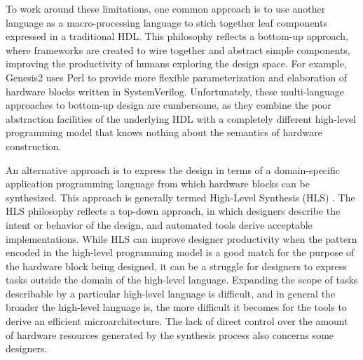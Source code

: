 To work around these limitations, one common approach is to use another language as a macro-processing language to stich together leaf components expressed in a traditional HDL. 
This philosophy reflects a bottom-up approach, where frameworks are created to wire together and abstract simple components, improving the productivity of humans exploring the design space.
For example, Genesis2 \cite{genesis2} uses Perl to provide more flexible parameterization and elaboration of hardware blocks written in SystemVerilog.
Unfortunately, these multi-language approaches to bottom-up design are cumbersome, as they combine the poor abstraction facilities of the underlying HDL with a completely different high-level programming model that knows nothing about the semantics of hardware construction.

An alternative approach is to express the design in terms of a domain-specific application programming language from which hardware blocks can be synthesized.
This approach is generally termed High-Level Synthesis (HLS) \cite{gajski2012hls}.
The HLS philosophy reflects a top-down approach, in which designers describe the intent or behavior of the design, and automated tools derive acceptable implementations.
While HLS can improve designer productivity when the pattern encoded in the high-level programming model is a good match for the purpose of the hardware block being designed, it can be a struggle for designers to express tasks outside the domain of the high-level language.
Expanding the scope of tasks describable by a particular high-level language is difficult, and
in general the broader the high-level language is, the more difficult it becomes for the tools to derive an efficient microarchitecture.
The lack of direct control over the amount of hardware resources generated by the synthesis process also concerns some designers.

